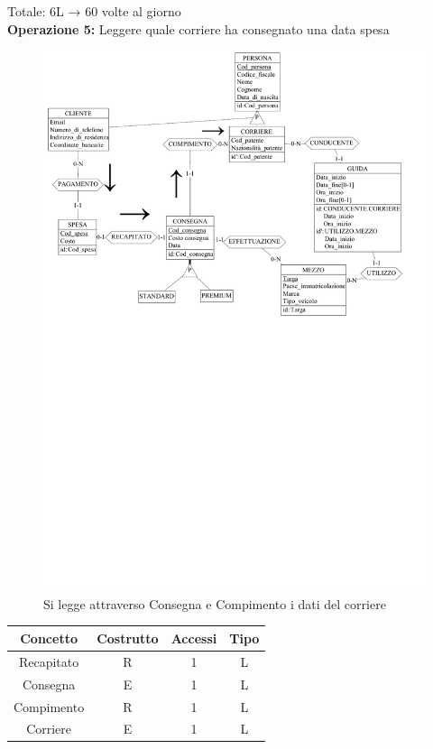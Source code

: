 \documentclass[a4paper,12pt]{report}
\begin{document}
Totale: 6L → 60 volte al giorno\\
\textbf{Operazione 5:}
Leggere quale corriere ha consegnato una data spesa\\
\begin{figure}[H]
	\centering{}
	\includegraphics[width=\textwidth]{img/Operazione5.pdf}
	\caption{Si legge attraverso Consegna e Compimento i dati del corriere}
\end{figure}
\begin{center}
    \begin{tabular}{ | c   c   c   c | } 
    \hline
	Concetto&Costrutto&Accessi&Tipo\\
	\hline
	Recapitato&R&1&L\\
	\hline
    Consegna&E&1&L\\
	\hline
	Compimento&R&1&L\\
	\hline
	Corriere&E&1&L\\
	\hline
	\end{tabular}
\end{center}
\end{document}
